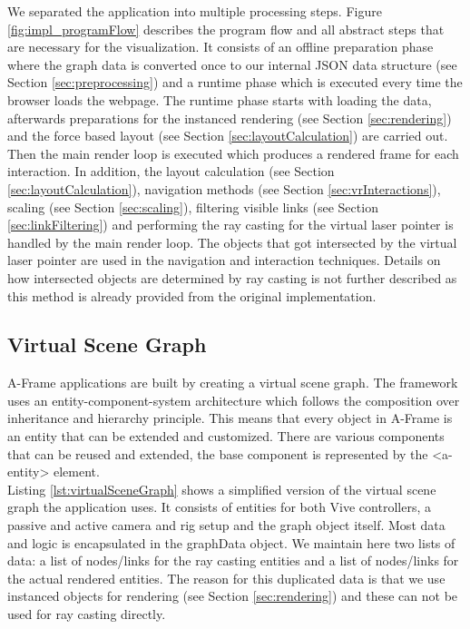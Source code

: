 We separated the application into multiple processing steps. Figure \ref{fig:impl_programFlow} describes the program flow and all abstract steps that are necessary for the visualization.
It consists of an offline preparation phase where the graph data is converted once to our internal JSON data structure (see Section \ref{sec:preprocessing}) and a runtime phase which is executed every time the browser loads the webpage.
The runtime phase starts with loading the data, afterwards preparations for the instanced rendering (see Section \ref{sec:rendering}) and the force based layout (see Section \ref{sec:layoutCalculation}) are carried out.
Then the main render loop is executed which produces a rendered frame for each interaction. In addition, the layout calculation (see Section \ref{sec:layoutCalculation}), navigation methods (see Section \ref{sec:vrInteractions}), scaling (see Section \ref{sec:scaling}), filtering visible links (see Section \ref{sec:linkFiltering}) and performing the ray casting for the virtual laser pointer is handled by the main render loop.
The objects that got intersected by the virtual laser pointer are used in the navigation and interaction techniques. 
Details on how intersected objects are determined by ray casting is not further described as this method is already provided from the original implementation. 

\subsection{Virtual Scene Graph}
A-Frame applications are built by creating a virtual scene graph.
The framework uses an entity-component-system architecture which follows the composition over inheritance and hierarchy principle. 
This means that every object in A-Frame is an entity that can be extended and customized.
There are various components that can be reused and extended, the base component is represented by the <a-entity> element.\\
Listing \ref{lst:virtualSceneGraph} shows a simplified version of the virtual scene graph the application uses. 
It consists of entities for both Vive controllers, a passive and active camera and rig setup and the graph object itself.
Most data and logic is encapsulated in the graphData object. We maintain here two lists of data: a list of nodes/links for the ray casting entities and a list of nodes/links for the actual rendered entities. 
The reason for this duplicated data is that we use  instanced objects for rendering (see Section \ref{sec:rendering}) and these can not be used for ray casting directly.

